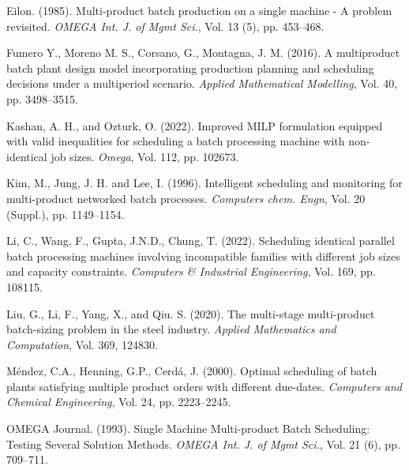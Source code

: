 \documentclass[authoryear,manuscript,12pt]{elsarticle}
\begin{document}
\begin{thebibliography}{1}


Eilon. (1985). Multi-product batch production on a single machine - A problem revisited. {\it OMEGA Int. J. of Mgmt Sci.}, Vol. 13 (5), pp. 453--468.

Fumero Y., Moreno M. S., Corsano, G., Montagna, J. M. (2016). A multiproduct batch plant design model incorporating production planning and scheduling decisions under a multiperiod scenario. {\it Applied Mathematical Modelling}, Vol. 40, pp. 3498--3515.

Kashan, A. H., and Ozturk, O. (2022). Improved MILP formulation equipped with valid inequalities for scheduling a batch processing machine with non-identical job sizes. {\it  Omega}, Vol. 112, pp. 102673.

Kim, M., Jung, J. H. and Lee, I. (1996). Intelligent scheduling and monitoring for multi-product networked batch processes. {\it  Computers chem. Engn}, Vol. 20 (Suppl.), pp. 1149--1154.

Li, C., Wang, F., Gupta, J.N.D., Chung, T. (2022). Scheduling identical parallel batch processing machines involving incompatible families with different job sizes and capacity constraints. {\it Computers \& Industrial Engineering}, Vol. 169, pp. 108115.

Liu, G., Li, F., Yang, X., and Qiu. S. (2020). The multi-stage multi-product batch-sizing problem in the steel industry. {\it  Applied Mathematics and Computation}, Vol. 369, 124830.

Méndez, C.A., Henning, G.P., Cerdá, J. (2000). Optimal scheduling of batch plants satisfying multiple product
orders with different due-dates. {\it Computers and Chemical Engineering}, Vol. 24, pp. 2223--2245.

OMEGA Journal. (1993). Single Machine Multi-product Batch Scheduling: Testing Several Solution Methods. {\it  OMEGA Int. J. of Mgmt Sci.}, Vol. 21 (6), pp. 709--711.


\end{thebibliography}
\end{document}
